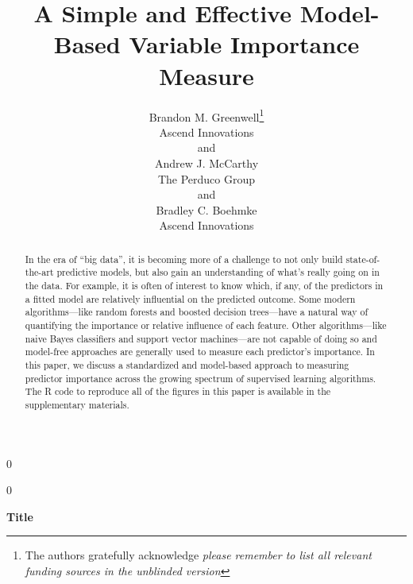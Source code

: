 \documentclass[12pt]{article}
\newcommand{\blind}{0}
\begin{document}
%

\def\spacingset#1{\renewcommand{\baselinestretch}%
{#1}\small\normalsize} \spacingset{1}



\blind
{
  \title{\bf A Simple and Effective Model-Based Variable Importance Measure}
  \author{Brandon M. Greenwell\thanks{
    The authors gratefully acknowledge \textit{please remember to list all relevant funding sources in the unblinded version}}\hspace{.2cm}\\
    Ascend Innovations           \\
    and \\
    Andrew J. McCarthy \\
    The Perduco Group \\
    and \\
    Bradley C. Boehmke \\
    Ascend Innovations}
  \maketitle
} \fi

\blind
{
  \bigskip
  \bigskip
  \bigskip
  \begin{center}
    {\LARGE\bf Title}
\end{center}
  \medskip
} \fi

\bigskip
\begin{abstract}
In the era of ``big data'', it is becoming more of a challenge to not only build state-of-the-art predictive models, but also gain an understanding of what's really going on in the data. For example, it is often of interest to know which, if any, of the predictors in a fitted model are relatively influential on the predicted outcome. Some modern algorithms---like random forests and boosted decision trees---have a natural way of quantifying the importance or relative influence of each feature. Other algorithms---like naive Bayes classifiers and support vector machines---are not capable of doing so and model-free approaches are generally used to measure each predictor's importance. In this paper, we discuss a standardized and model-based approach to measuring predictor importance across the growing spectrum of supervised learning algorithms. The R code to reproduce all of the figures in this paper is available in the supplementary materials.
\end{abstract}
\end{document}

